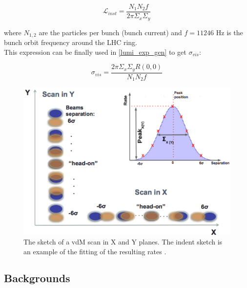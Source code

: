 \begin{equation}
\mathcal{L}_{inst}=\frac{N_{1} N_{2}f}{2 \pi \Sigma_{x}\Sigma_{y}}
\end{equation}

where $N_{1,2}$ are the particles per bunch (bunch current) and  $f= 11246$ Hz is the bunch orbit frequency around the LHC ring.\\
This expression can be finally used in \ref{lumi_exp_gen} to get $\sigma_{vis}$:

\begin{equation}
  \sigma_{vis}=\frac{2\pi \Sigma_{x} \Sigma_{y} R(0, 0)}{N_{1}N_{2} f}
  \label{sigmavis_eq}
\end{equation}


\begin{center}
  \begin{figure}[ht]
    \centering
    \includegraphics[scale=.37]{Chapter3/vdm_sketch.png}
    \caption[Sketch of a vdM scan in X and Y planes and example of fitting resulting rates]{ The sketch of a vdM scan in X and Y planes. The indent sketch is an example of the fitting of the resulting rates \cite{vdM_sketch}.}
    \label{vdm_sketch}
  \end{figure}
\end{center}







\subsection*{Backgrounds}




